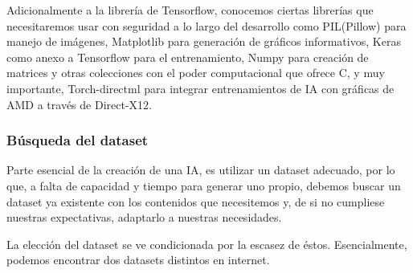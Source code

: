 \documentclass{article}
\begin{document}
Adicionalmente a la librería de Tensorflow, conocemos ciertas librerías que necesitaremos usar con seguridad a lo largo del desarrollo como PIL(Pillow) para manejo de imágenes, Matplotlib para generación de gráficos informativos, Keras como anexo a Tensorflow para el entrenamiento, Numpy para creación de matrices y otras colecciones con el poder computacional que ofrece C, y muy importante, Torch-directml para integrar entrenamientos de IA con gráficas de AMD a través de Direct-X12.

\subsubsection{Búsqueda del dataset}
Parte esencial de la creación de una IA, es utilizar un dataset adecuado, por lo que, a falta de capacidad y tiempo para generar uno propio, debemos buscar un dataset ya existente con los contenidos que necesitemos y, de si no cumpliese nuestras expectativas, adaptarlo a nuestras necesidades.

La elección del dataset se ve condicionada por la escasez de éstos. Esencialmente, podemos encontrar dos datasets distintos en internet.
\end{document}
